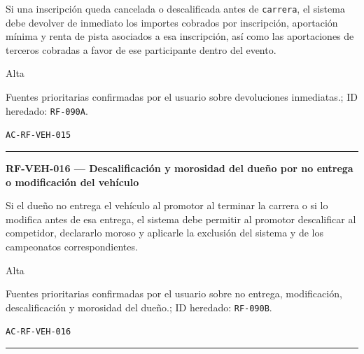 \documentclass[10pt,letterpaper]{article}
\begin{document}
\begin{description}[style=nextline,leftmargin=3.15cm,labelwidth=2.8cm,font=\normalfont\bfseries]
\item[Obligación] Si una inscripción queda cancelada o descalificada antes de \texttt{carrera}, el sistema debe devolver de inmediato los importes cobrados por inscripción, aportación mínima y renta de pista asociados a esa inscripción, así como las aportaciones de terceros cobradas a favor de ese participante dentro del evento.
\item[Prioridad] Alta
\item[Procedencia] Fuentes prioritarias confirmadas por el usuario sobre devoluciones inmediatas.; ID heredado: \texttt{RF-090A}.
\item[Verificación] \texttt{AC-RF-VEH-015}
\end{description}
\vspace{0.25em}\hrule\vspace{0.65em}
\noindent\textbf{RF-VEH-016 --- Descalificación y morosidad del dueño por no entrega o modificación del vehículo}\par
\begin{description}[style=nextline,leftmargin=3.15cm,labelwidth=2.8cm,font=\normalfont\bfseries]
\item[Obligación] Si el dueño no entrega el vehículo al promotor al terminar la carrera o si lo modifica antes de esa entrega, el sistema debe permitir al promotor descalificar al competidor, declararlo moroso y aplicarle la exclusión del sistema y de los campeonatos correspondientes.
\item[Prioridad] Alta
\item[Procedencia] Fuentes prioritarias confirmadas por el usuario sobre no entrega, modificación, descalificación y morosidad del dueño.; ID heredado: \texttt{RF-090B}.
\item[Verificación] \texttt{AC-RF-VEH-016}
\end{description}
\vspace{0.25em}\hrule\vspace{0.65em}
\end{document}
